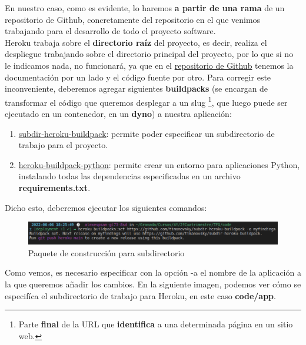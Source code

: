 En nuestro caso, como es evidente, lo haremos \textbf{a partir de una rama} de un
repositorio de Github, concretamente del repositorio en el que venimos trabajando
para el desarrollo de todo el proyecto software.\\

Heroku trabaja sobre el \textbf{directorio raíz} del proyecto, es decir, realiza el
despliegue trabajando sobre el directorio principal del proyecto, por lo que si no le
indicamos nada, no funcionará, ya que en el \href{https://github.com/alexespana/TFG}
{repositorio de Github} tenemos la documentación por un lado y el código fuente por
otro. Para corregir este inconveniente, deberemos agregar siguientes \textbf{buildpacks}
(se encargan de transformar el código que queremos desplegar a un slug \footnote{Parte
\textbf{final} de la URL que \textbf{identifica} a una determinada página en un sitio
web.}, que luego puede ser ejecutado en un contenedor, en un \textbf{dyno}) a nuestra
aplicación:

    \begin{enumerate}
        \item \href{https://elements.heroku.com/buildpacks/timanovsky/subdir-heroku-buildpack}
        {subdir-heroku-buildpack}: permite poder especificar un subdirectorio de trabajo
        para el proyecto.
        \item \href{https://elements.heroku.com/buildpacks/heroku/heroku-buildpack-python}
        {heroku-buildpack-python}: permite crear un entorno para aplicaciones Python,
        instalando todas las dependencias especificadas en un archivo
        \textbf{requirements.txt}.
    \end{enumerate}

Dicho esto, deberemos ejecutar los siguientes comandos:

    \begin{figure}[H]
        \centering
        \includegraphics[scale=0.39]{imagenes/first-buildpack.png}
        \caption{Paquete de construcción para subdirectorio}
        \label{fig:subdir-heroku-buildpack}
    \end{figure}

Como vemos, es necesario especificar con la opción -a el nombre de la aplicación a la que
queremos añadir los cambios. En la siguiente imagen, podemos ver cómo se especifíca el
subdirectorio de trabajo para Heroku, en este caso \textbf{code/app}.


